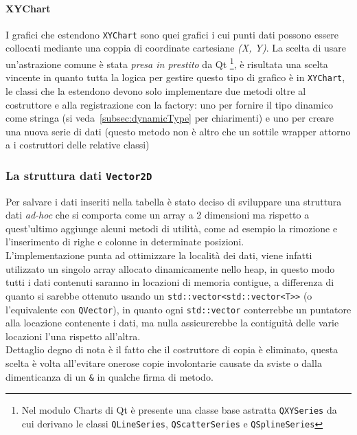 \paragraph{XYChart}
I grafici che estendono \texttt{XYChart} sono quei grafici i cui punti dati possono essere collocati mediante una
coppia di coordinate cartesiane \textit{(X, Y)}.
La scelta di usare un'astrazione comune è stata \textit{presa in prestito} da Qt \footnote{Nel modulo Charts di Qt è
presente una classe base astratta \texttt{QXYSeries} da cui derivano le classi \texttt{QLineSeries},
\texttt{QScatterSeries} e \texttt{QSplineSeries}}, è risultata una scelta vincente in quanto tutta la logica per gestire
questo tipo di grafico è in \texttt{XYChart}, le classi che la estendono devono solo implementare due metodi oltre al
costruttore e alla registrazione con la factory: uno per fornire il tipo dinamico come stringa (si
veda~\ref{subsec:dynamicType} per chiarimenti) e uno per creare una nuova serie di dati (questo metodo non è altro
che un sottile wrapper attorno a i costruttori delle relative classi)

\subsubsection{La struttura dati \texttt{Vector2D}}
Per salvare i dati inseriti nella tabella è stato deciso di sviluppare una struttura dati \textit{ad-hoc} che si
comporta come un array a 2 dimensioni ma rispetto a quest'ultimo aggiunge alcuni metodi di utilità, come ad esempio la
rimozione e l'inserimento di righe e colonne in determinate posizioni.\\
L'implementazione punta ad ottimizzare la località dei dati, viene infatti utilizzato un singolo array allocato
dinamicamente nello heap, in questo modo tutti i dati contenuti saranno in locazioni di memoria contigue, a differenza
di quanto si sarebbe ottenuto usando un \texttt{std::vector<std::vector<T>>} (o l'equivalente con \texttt{QVector}), in
quanto ogni \texttt{std::vector} conterrebbe un puntatore alla locazione contenente i dati, ma nulla assicurerebbe la
contiguità delle varie locazioni l'una rispetto all'altra.\\
Dettaglio degno di nota è il fatto che il costruttore di copia è eliminato, questa scelta è volta all'evitare
onerose copie involontarie causate da sviste o dalla dimenticanza di un \texttt{\&} in qualche firma di metodo.

